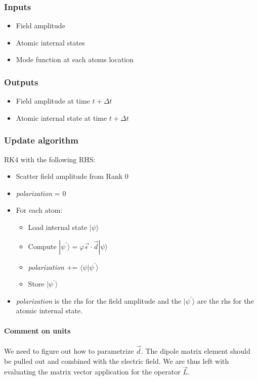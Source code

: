 \documentclass[aps, superscriptaddress, groupedaddress, preprint]{revtex4}
\begin{document}
\subsubsection{Inputs}

\begin{itemize}
\item Field amplitude
\item Atomic internal states
\item Mode function at each atoms location
\end{itemize}


\subsubsection{Outputs}

\begin{itemize}
\item Field amplitude at time $t+\Delta t$
\item Atomic internal state at time $t+\Delta t$
\end{itemize}


\subsubsection{Update algorithm}

RK4 with the following RHS:

\begin{itemize}
\item Scatter field amplitude from Rank 0
\item {\it polarization} = 0
\item For each atom:
\begin{itemize}
  \item Load internal state $|\psi\rangle$
  \item Compute $|\psi^\prime\rangle =
                 \varphi\vec{\epsilon}\cdot\vec{d}|\psi\rangle$
  \item {\it polarization} += $\langle\psi|\psi^\prime\rangle$
  \item Store $|\psi^\prime\rangle$
\end{itemize}
\item {\it polarization} is the rhs for the field amplitude and
the $|\psi^\prime\rangle$ are the rhs for the atomic internal
state.
\end{itemize}

\paragraph{Comment on units} We need to figure out how to
parametrize $\vec{d}$.  The dipole matrix element should be
pulled out and combined with the electric field.  We are thus
left with evaluating the matrix vector application for the
operator $\vec{L}$.
\end{document}
